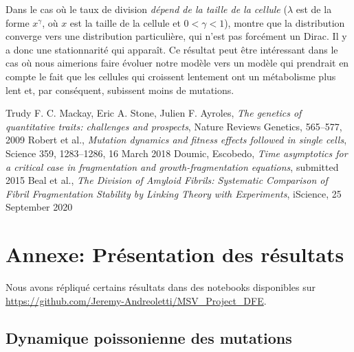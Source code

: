 \documentclass[12pt]{article}
\begin{document}
Dans le cas où le taux de division \emph{dépend de la taille de la cellule} ($\lambda$ est de la forme $x^{\gamma}$, où $x$ est la taille de la cellule et $0<\gamma<1$), \cite{md2} montre que la distribution converge vers une distribution particulière, qui n'est pas forcément un Dirac. Il y a donc une stationnarité qui apparaît. Ce résultat peut être intéressant dans le cas où nous aimerions faire évoluer notre modèle vers un modèle qui prendrait en compte le fait que les cellules qui croissent lentement ont un métabolisme plus lent et, par conséquent, subissent moins de mutations.




\begin{thebibliography}{1}

  Trudy F. C. Mackay, Eric A. Stone, Julien F. Ayroles,
  \emph{The genetics of quantitative traits: challenges and prospects}, Nature Reviews Genetics, 565–577, 2009
  Robert et al.,
  \emph{Mutation dynamics and fitness effects followed in single cells}, Science 359, 1283–1286, 16 March 2018
  Doumic, Escobedo,
  \emph{Time asymptotics for a critical case in fragmentation and growth-fragmentation equations}, submitted 2015
  Beal et al.,
  \emph{The Division of Amyloid Fibrils: Systematic Comparison of Fibril Fragmentation Stability by Linking Theory with Experiments}, iScience, 25 September 2020
\end{thebibliography}





\newpage

\appendix

\FloatBarrier
\section{Annexe: Présentation des résultats}

Nous avons répliqué certains résultats dans des notebooks disponibles sur \url{https://github.com/Jeremy-Andreoletti/MSV_Project_DFE}.
%

\subsection{Dynamique poissonienne des mutations}
\end{document}
